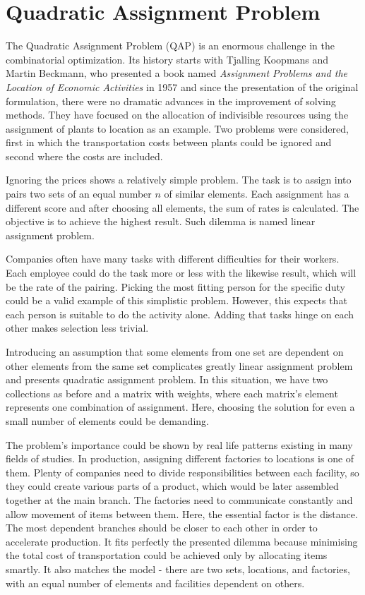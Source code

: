 \section{Quadratic Assignment Problem}
\label{section:background_qap}

The Quadratic Assignment Problem (QAP) is an enormous challenge in the combinatorial optimization.
Its history starts with Tjalling Koopmans and Martin Beckmann, who presented a book named \textit{Assignment Problems and the Location of Economic Activities} in 1957 \cite{koopmans-beckmann1957} and since the presentation of the original formulation, there were no dramatic advances in the improvement of solving methods.
They have focused on the allocation of indivisible resources using the assignment of plants to location as an example.
Two problems were considered, first in which the transportation costs between plants could be ignored and second where the costs are included.

Ignoring the prices shows a relatively simple problem.
The task is to assign into pairs two sets of an equal number $n$ of similar elements.
Each assignment has a different score and after choosing all elements, the sum of rates is calculated.
The objective is to achieve the highest result.
Such dilemma is named linear assignment problem.

Companies often have many tasks with different difficulties for their workers.
Each employee could do the task more or less with the likewise result, which will be the rate of the pairing.
Picking the most fitting person for the specific duty could be a valid example of this simplistic problem.
However, this expects that each person is suitable to do the activity alone.
Adding that tasks hinge on each other makes selection less trivial.

Introducing an assumption that some elements from one set are dependent on other elements from the same set complicates greatly linear assignment problem and presents quadratic assignment problem.
In this situation, we have two collections as before and a matrix with weights, where each matrix's element represents one combination of assignment.
Here, choosing the solution for even a small number of elements could be demanding.

The problem's importance could be shown by real life patterns existing in many fields of studies.
In production, assigning different factories to locations is one of them.
Plenty of companies need to divide responsibilities between each facility, so they could create various parts of a product, which would be later assembled together at the main branch.
The factories need to communicate constantly and allow movement of items between them.
Here, the essential factor is the distance.
The most dependent branches should be closer to each other in order to accelerate production.
It fits perfectly the presented dilemma because minimising the total cost of transportation could be achieved only by allocating items smartly.
It also matches the model - there are two sets, locations, and factories, with an equal number of elements and facilities dependent on others.

